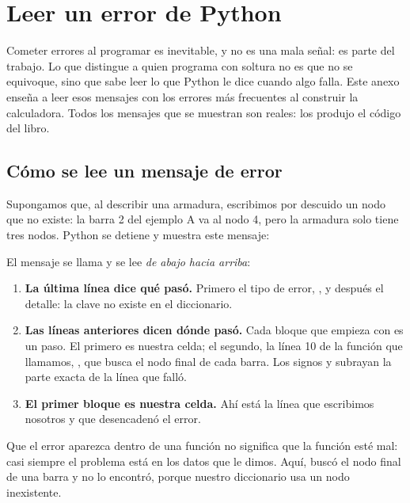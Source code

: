 \chapter{Leer un error de Python}\label{cap:leer_errores}

Cometer errores al programar es inevitable, y no es una mala señal: es parte
del trabajo. Lo que distingue a quien programa con soltura no es que no se
equivoque, sino que sabe leer lo que Python le dice cuando algo falla. Este
anexo enseña a leer esos mensajes con los errores más frecuentes al construir
la calculadora. Todos los mensajes que se muestran son reales: los produjo el
código del libro.

\section{Cómo se lee un mensaje de error}\label{sec:b_leer}

Supongamos que, al describir una armadura, escribimos por descuido un nodo que
no existe: la barra 2 del ejemplo A va al nodo 4, pero la armadura solo tiene
tres nodos.
Python se detiene y muestra este mensaje:

El mensaje se llama  y se lee \emph{de abajo hacia
arriba}:
\begin{enumerate}
  \item \textbf{La última línea dice qué pasó.} Primero el tipo de error,
    , y después el detalle: la clave  no existe en el
    diccionario.
  \item \textbf{Las líneas anteriores dicen dónde pasó.} Cada bloque que
    empieza con  es un paso. El primero es nuestra celda; el
    segundo, la línea 10 de la función que llamamos,
    , que busca el nodo final de cada barra. Los
    signos \py{~}
    y \py{^} subrayan la parte exacta de la línea que
    falló.
  \item \textbf{El primer bloque es nuestra celda.} Ahí está la línea que
    escribimos nosotros y que desencadenó el error.
\end{enumerate}

Que el error aparezca dentro de una función no significa que la función esté
mal: casi siempre el problema está en los datos que le dimos. Aquí,
 buscó el nodo final de una barra y no lo encontró,
porque nuestro diccionario  usa un nodo inexistente.

